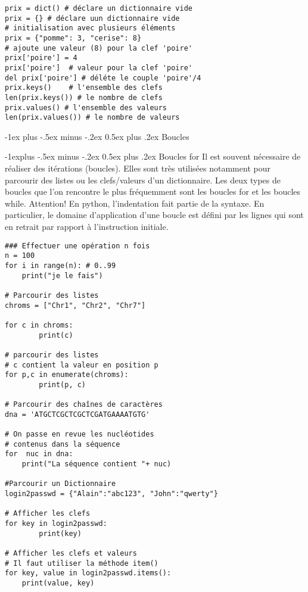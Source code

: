 \documentclass[10pt,landscape]{article}
\makeatletter
\renewcommand{\section}{\@startsection{section}{1}{0mm}%
                                {-1ex plus -.5ex minus -.2ex}%
                                {0.5ex plus .2ex}%
                                {\normalfont\large\bfseries}}
\renewcommand{\subsection}{\@startsection{subsection}{2}{0mm}%
                                {-1explus -.5ex minus -.2ex}%
                                {0.5ex plus .2ex}%
                                {\normalfont\normalsize\bfseries}}
\makeatother
\begin{document}
\begin{multicols}{3}
\begin{lstlisting}
prix = dict() # déclare un dictionnaire vide
prix = {} # déclare uun dictionnaire vide
# initialisation avec plusieurs éléments
prix = {"pomme": 3, "cerise": 8}
# ajoute une valeur (8) pour la clef 'poire'  
prix['poire'] = 4 
prix['poire']  # valeur pour la clef 'poire'
del prix['poire'] # déléte le couple 'poire'/4
prix.keys()    # l'ensemble des clefs
len(prix.keys()) # le nombre de clefs
prix.values() # l'ensemble des valeurs
len(prix.values()) # le nombre de valeurs
\end{lstlisting}


\section{Boucles}

\subsection{Boucles for}
Il est souvent nécessaire de réaliser des itérations (boucles). Elles sont très utilisées notamment pour parcourir des listes ou les clefs/valeurs d'un dictionnaire. Les deux types de boucles que l'on rencontre le plus fréquemment sont les boucles for et les boucles while.
Attention! En python, l'indentation fait partie de la syntaxe. En particulier, le domaine d'application d'une boucle est défini par les lignes qui sont en retrait par rapport à l'instruction initiale.

\begin{lstlisting}
### Effectuer une opération n fois
n = 100
for i in range(n): # 0..99
	print("je le fais")

# Parcourir des listes
chroms = ["Chr1", "Chr2", "Chr7"]

for c in chroms:
        print(c)

# parcourir des listes
# c contient la valeur en position p        
for p,c in enumerate(chroms):
        print(p, c)

# Parcourir des chaînes de caractères
dna = 'ATGCTCGCTCGCTCGATGAAAATGTG'

# On passe en revue les nucléotides
# contenus dans la séquence
for  nuc in dna:
	print("La séquence contient "+ nuc)

#Parcourir un Dictionnaire
login2passwd = {"Alain":"abc123", "John":"qwerty"} 

# Afficher les clefs
for key in login2passwd:
        print(key)

# Afficher les clefs et valeurs 
# Il faut utiliser la méthode item()
for key, value in login2passwd.items():
	print(value, key)
\end{lstlisting}


\end{multicols}
\end{document}
